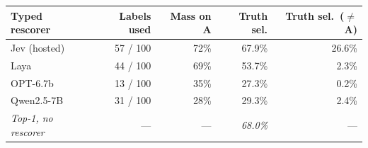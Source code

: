 \begin{tabular}{lrrrr}
\toprule
Typed rescorer & Labels used & Mass on A & Truth sel. & Truth sel.\ ($\ne$A) \\
\midrule
Jev (hosted) & 57 / 100 & 72\% & 67.9\% & 26.6\% \\
Laya & 44 / 100 & 69\% & 53.7\% & 2.3\% \\
OPT-6.7b & 13 / 100 & 35\% & 27.3\% & 0.2\% \\
Qwen2.5-7B & 31 / 100 & 28\% & 29.3\% & 2.4\% \\
\midrule
\emph{Top-1, no rescorer} & --- & --- & \emph{68.0\%} & --- \\
\bottomrule
\end{tabular}
